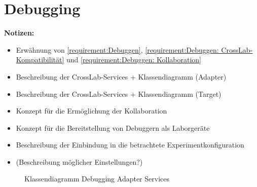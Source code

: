 \section{Debugging}\label{section:konzeption:debugging}

\begin{note}
    \textbf{Notizen:}
    \begin{itemize}
        \item Erwähnung von \autoref{requirement:Debuggen}, \autoref{requirement:Debuggen: CrossLab-Kompatibilität} und \autoref{requirement:Debuggen: Kollaboration}
        \item Beschreibung der CrossLab-Services + Klassendiagramm (Adapter)
        \item Beschreibung der CrossLab-Services + Klassendiagramm (Target)
        \item Konzept für die Ermöglichung der Kollaboration
        \item Konzept für die Bereitstellung von Debuggern als Laborgeräte
        \item Beschreibung der Einbindung in die betrachtete Experimentkonfiguration
        \item (Beschreibung möglicher Einstellungen?)
    \end{itemize}
\end{note}

\begin{figure}[tbp]
    \centering
    \caption{Klassendiagramm Debugging Adapter Services}
    \label{figure:klassendiagramm-debugging-adapter-services}
\end{figure}


